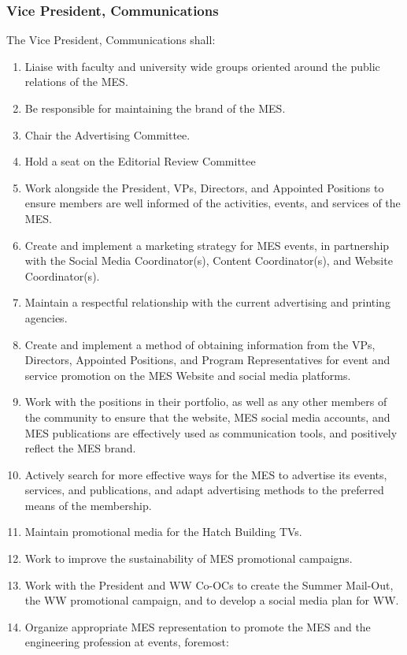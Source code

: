 \subsubsection{Vice President,
 Communications}
\label{vice-president-communications}
The Vice President, Communications shall:

\begin{enumerate}
 \item
  Liaise with faculty and university wide groups oriented around the public relations of the MES.
 \item
  Be responsible for maintaining the brand of the MES.
 \item
  Chair the Advertising Committee. 
 \item 
  Hold a seat on the Editorial Review Committee 
 \item 
  Work alongside the President, VPs, Directors, and Appointed Positions to ensure members are well informed of the activities, events, and services of the MES.
 \item
  Create and implement a marketing strategy for MES events, in partnership with the Social Media Coordinator(s), Content Coordinator(s), and Website Coordinator(s).
 \item
  Maintain a respectful relationship with the current advertising and printing agencies.
 \item
  Create and implement a method of obtaining information from the VPs, Directors, Appointed Positions, and Program Representatives for event and service promotion on the MES Website and social media platforms.
 \item
  Work with the positions in their portfolio, as well as any other members of the community to ensure that the website, MES social media accounts, and MES publications are effectively used as communication tools, and positively reflect the MES brand.
 \item
  Actively search for more effective ways for the MES to advertise its events, services, and publications, and adapt advertising methods to the preferred means of the membership.
 \item
  Maintain promotional media for the Hatch Building TVs.
 \item
  Work to improve the sustainability of MES promotional campaigns.
 \item
  Work with the President and WW Co-OCs to create the Summer Mail-Out, the WW promotional campaign, and to develop a social media plan for WW.
 \item
  Organize appropriate MES representation to promote the MES and the engineering profession at events, foremost:


\end{enumerate}
